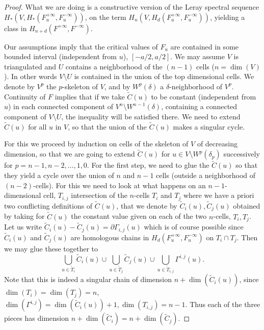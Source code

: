 \documentclass[JEP,XML,SOM,NoFloatCountersInSection,Unicode,published]{cedram}
\numberwithin{equation}{section}
\theoremstyle{plain}
\theoremstyle{definition}
\theoremstyle{remark}
\begin{document}
\begin{proof} What we are doing is a constructive version of the Leray spectral sequence $H_*(V, H_*(F_u^{+\infty}, F_u^{-\infty}))$, on the term $H_n(V, H_d(F_u^{+\infty}, F_u^{-\infty}))$, yielding a class in $H_{n+d} (F^{+\infty}, F^{-\infty})$.

Our assumptions imply that the critical values of $F_{u}$ are contained in some bounded interval (independent from $u$), $[-a/2, a/2]$.
We may assume $V$ is triangulated and $U$ contains a neighborhood of the $(n-1)$ cells ($n=\dim (V)$). In other words $V\setminus U$ is contained in the union of the top dimensional cells. We denote by $V^{p}$ the $p$-skeleton of $V$, and by $W^{p}(\delta)$ a $\delta$-neighborhood of $V^{p}$.
Continuity of $F$ implies that if we take $\widetilde C(u)$ to be constant (\ie independent from $u$) in each connected component of $V^{n}\setminus W^{n-1}(\delta)$, containing a connected component of $V\setminus U$, the inequality will be satisfied there. We need to extend
$\widetilde C(u)$ for all $u$ in $V$, so that the union of the $\widetilde C(u)$ makes a singular cycle.

For this we proceed by induction on cells of the skeleton of $V$ of decreasing dimension, so that we are going to extend $\widetilde C (u)$ for $u\in V\setminus W^{p}(\delta_{p})$ successively for $p=n-1, n-2,\dots, 1, 0$.
For the first step, we need to glue the $\widetilde C (u)$ so that they yield a cycle over the union of $n$ and $n-1$ cells (outside a neighborhood of $(n-2)$-cells).
For this we need to look at what happens on an $n-1$-dimensional cell, $T_{i,j}$ intersection of the $n$-cells $T_{i}$ and $T_{j}$ where we have a priori two conflicting definitions of $\widetilde C(u)$, that we denote
by $\widetilde C_{i}(u), \widetilde C_{j}(u)$ obtained by taking for $\widetilde C (u)$ the constant value given on each of the two $n$-cells, $T_{i}, T_{j}$. Let us write $\widetilde C_{i}(u)-\widetilde C_{j}(u)=\partial { \Gamma}_{i,j}(u)$ which is of course possible
since ${\widetilde C}_{i}(u)$ and ${\widetilde C}_{j}(u)$ are homologous chains in $H_{d}(F_{u}^{+\infty}, F_{u}^{-\infty})$ on $T_{i}\cap T_{j}$. Then we may glue these together to
\[
\bigcup_{u\in \mathring{T}_{i} }{\widetilde C}_{i}(u)\cup \bigcup_{u\in \mathring{T}_{j} }{\widetilde C}_{j}(u)\cup \bigcup_{u\in \mathring{T}_{i,j} }{\Gamma}^{i,j}(u).
\]
Note that this is indeed a singular chain of dimension $n+\dim ({\widetilde C}_{i}(u))$, since $\dim (T_{i})=\dim (T_{j})=n$, $ \dim ({\Gamma}^{i,j})=\dim ({\widetilde C}_{i}(u))+1, \dim(T_{i,j})=n-1$. Thus each of the three pieces has dimension
$n+\dim ({\widetilde C}_{i})=n+\dim ({\widetilde C}_{j})$.


\end{proof}
\end{document}
